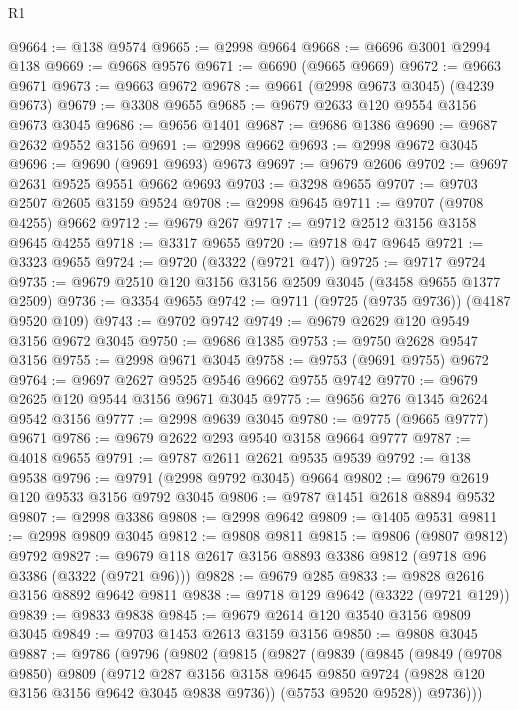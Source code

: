 \begin{lexlean}{R1}
\begin{coremodule}
@9664 := @138 @9574
@9665 := @2998 @9664
@9668 := @6696 @3001 @2994 @138
@9669 := @9668 @9576
@9671 := @6690 (@9665 @9669)
@9672 := @9663 @9671
@9673 := @9663 @9672
@9678 := @9661 (@2998 @9673 @3045) (@4239 @9673)
@9679 := @3308 @9655
@9685 := @9679 @2633 @120 @9554 @3156 @9673 @3045
@9686 := @9656 @1401
@9687 := @9686 @1386
@9690 := @9687 @2632 @9552 @3156
@9691 := @2998 @9662
@9693 := @2998 @9672 @3045
@9696 := @9690 (@9691 @9693) @9673
@9697 := @9679 @2606
@9702 := @9697 @2631 @9525 @9551 @9662 @9693
@9703 := @3298 @9655
@9707 := @9703 @2507 @2605 @3159 @9524
@9708 := @2998 @9645
@9711 := @9707 (@9708 @4255) @9662
@9712 := @9679 @267
@9717 := @9712 @2512 @3156 @3158 @9645 @4255
@9718 := @3317 @9655
@9720 := @9718 @47 @9645
@9721 := @3323 @9655
@9724 := @9720 (@3322 (@9721 @47))
@9725 := @9717 @9724
@9735 := @9679 @2510 @120 @3156 @3156 @2509 @3045 (@3458 @9655 @1377 @2509)
@9736 := @3354 @9655
@9742 := @9711 (@9725 (@9735 @9736)) (@4187 @9520 @109)
@9743 := @9702 @9742
@9749 := @9679 @2629 @120 @9549 @3156 @9672 @3045
@9750 := @9686 @1385
@9753 := @9750 @2628 @9547 @3156
@9755 := @2998 @9671 @3045
@9758 := @9753 (@9691 @9755) @9672
@9764 := @9697 @2627 @9525 @9546 @9662 @9755 @9742
@9770 := @9679 @2625 @120 @9544 @3156 @9671 @3045
@9775 := @9656 @276 @1345 @2624 @9542 @3156
@9777 := @2998 @9639 @3045
@9780 := @9775 (@9665 @9777) @9671
@9786 := @9679 @2622 @293 @9540 @3158 @9664 @9777
@9787 := @4018 @9655
@9791 := @9787 @2611 @2621 @9535 @9539
@9792 := @138 @9538
@9796 := @9791 (@2998 @9792 @3045) @9664
@9802 := @9679 @2619 @120 @9533 @3156 @9792 @3045
@9806 := @9787 @1451 @2618 @8894 @9532
@9807 := @2998 @3386
@9808 := @2998 @9642
@9809 := @1405 @9531
@9811 := @2998 @9809 @3045
@9812 := @9808 @9811
@9815 := @9806 (@9807 @9812) @9792
@9827 := @9679 @118 @2617 @3156 @8893 @3386 @9812 (@9718 @96 @3386 (@3322 (@9721 @96)))
@9828 := @9679 @285
@9833 := @9828 @2616 @3156 @8892 @9642 @9811
@9838 := @9718 @129 @9642 (@3322 (@9721 @129))
@9839 := @9833 @9838
@9845 := @9679 @2614 @120 @3540 @3156 @9809 @3045
@9849 := @9703 @1453 @2613 @3159 @3156
@9850 := @9808 @3045
@9887 := @9786
    (@9796
      (@9802
        (@9815
          (@9827
            (@9839
              (@9845
                (@9849
                  (@9708 @9850)
                  @9809
                  (@9712
                    @287
                    @3156
                    @3158
                    @9645
                    @9850
                    @9724
                    (@9828 @120 @3156 @3156 @9642 @3045 @9838 @9736))
                  (@5753 @9520 @9528))
                @9736)))

\end{coremodule}
\end{lexlean}
